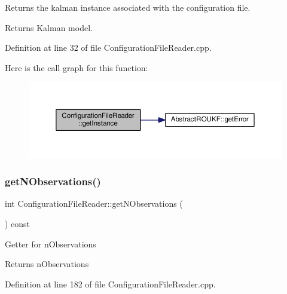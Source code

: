 Returns the kalman instance associated with the configuration file. \begin{DoxyReturn}{Returns}
Kalman model. 
\end{DoxyReturn}


Definition at line 32 of file Configuration\+File\+Reader.\+cpp.

Here is the call graph for this function\+:\nopagebreak
\begin{figure}[H]
\begin{center}
\leavevmode
\includegraphics[width=350pt]{classConfigurationFileReader_a2bea7f730d5caf67b9d3e1bf45072542_cgraph}
\end{center}
\end{figure}
\mbox{\label{classConfigurationFileReader_aaf21e598e8fcf28ed762af515946aef1}} 
\subsubsection{\texorpdfstring{get\+N\+Observations()}{getNObservations()}}
{\footnotesize\ttfamily int Configuration\+File\+Reader\+::get\+N\+Observations (\begin{DoxyParamCaption}{ }\end{DoxyParamCaption}) const}

Getter for {\ttfamily n\+Observations} \begin{DoxyReturn}{Returns}
{\ttfamily n\+Observations} 
\end{DoxyReturn}


Definition at line 182 of file Configuration\+File\+Reader.\+cpp.

\mbox{\label{classConfigurationFileReader_a3d3b4191df51eb5e560716bc5e034f8a}} 
